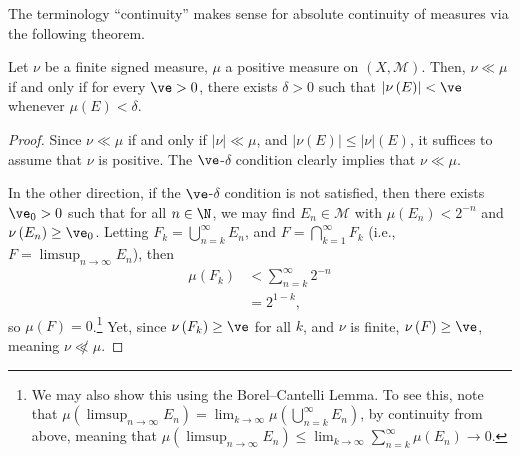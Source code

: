 \documentclass[10pt]{mypackage}
\begin{document}
The terminology ``continuity'' makes sense for absolute continuity of measures via the following theorem.
\begin{theorem}
  Let $\nu$ be a finite signed measure, $\mu$ a positive measure on $\left( X,\mathcal{M} \right)$. Then, $\nu\ll\mu$ if and only if for every $\ve > 0$, there exists $\delta > 0$ such that $\left\vert \nu\left( E \right) \right\vert < \ve$ whenever $\mu\left( E \right) < \delta$.
\end{theorem}
\begin{proof}
  Since $\nu\ll\mu$ if and only if $\left\vert \nu \right\vert\ll\mu$, and $\left\vert \nu\left( E \right) \right\vert \leq \left\vert \nu \right\vert\left( E \right)$, it suffices to assume that $\nu$ is positive. The $\ve$-$\delta$ condition clearly implies that $\nu\ll\mu$.\newline

  In the other direction, if the $\ve$-$\delta$ condition is not satisfied, then there exists $\ve_0 > 0$ such that for all $n\in \N$, we may find $E_{n}\in \mathcal{M}$ with $\mu\left( E_n \right) < 2^{-n}$ and $\nu\left( E_n \right) \geq \ve_0$. Letting $F_k = \bigcup_{n=k}^{\infty} E_n$, and $F = \bigcap_{k=1}^{\infty}F_k$ (i.e., $F = \limsup_{n\rightarrow\infty} E_n$), then
  \begin{align*}
    \mu\left( F_k \right) &< \sum_{n=k}^{\infty} 2^{-n}\\
                          &= 2^{1-k},
  \end{align*}
  so $\mu\left( F \right) = 0$.\footnote{\scriptsize We may also show this using the Borel--Cantelli Lemma. To see this, note that $\mu\left( \limsup_{n\rightarrow\infty} E_n \right) = \lim_{k\rightarrow\infty}\mu\left( \bigcup_{n=k}^{\infty} E_n \right)$, by continuity from above, meaning that $\mu\left( \limsup_{n\rightarrow\infty} E_n \right) \leq \lim_{k\rightarrow\infty}\sum_{n=k}^{\infty} \mu\left( E_n \right)\rightarrow 0$.} Yet, since $\nu\left( F_k \right) \geq \ve$ for all $k$, and $\nu$ is finite, $\nu\left( F \right) \geq \ve$, meaning $\nu\not\ll\mu$.
\end{proof}
\end{document}
